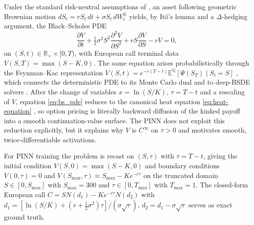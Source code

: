 Under the standard risk-neutral assumptions of \textcite{black1973pricing,merton1973rational}, an asset following geometric Brownian motion $dS_t=rS_t\,dt+\sigma S_t\,dW_t^{\mathbb{Q}}$ yields, by It\^o's lemma \parencite{itoh1944stochastic} and a $\Delta$-hedging argument, the Black--Scholes PDE
\begin{equation}\label{eq:bs_pde}
    \frac{\partial V}{\partial t}+\tfrac{1}{2}\sigma^2 S^2\frac{\partial^2 V}{\partial S^2}+rS\frac{\partial V}{\partial S}-rV=0,
\end{equation}
on $(S,t)\in\mathbb{R}_+\times[0,T)$, with European call terminal data $V(S,T)=\max(S-K,0)$. The same equation arises probabilistically through the Feynman--Kac representation $V(S,t)=e^{-r(T-t)}\mathbb{E}^{\mathbb{Q}}[\Psi(S_T)\mid S_t=S]$ \parencite{shreve2004stochastic}, which connects the deterministic PDE to its Monte Carlo dual \parencite{glasserman2003monte} and to deep-BSDE solvers \parencite{han2018solving,e2017deep,beck2020deepbsde}. After the change of variables $x=\ln(S/K)$, $\tau=T-t$ and a rescaling of $V$, equation \eqref{eq:bs_pde} reduces to the canonical heat equation \eqref{eq:heat-equation} \parencite{wilmott1995mathematics,capinski2012blackscholes}, so option pricing is literally backward diffusion of the kinked payoff into a smooth continuation-value surface. The PINN does not exploit this reduction explicitly, but it explains why $V$ is $C^{\infty}$ on $\tau>0$ and motivates smooth, twice-differentiable activations.

For PINN training the problem is recast on $(S,\tau)$ with $\tau=T-t$, giving the initial condition $V(S,0)=\max(S-K,0)$ and boundary conditions $V(0,\tau)=0$ and $V(S_{\max},\tau)\approx S_{\max}-Ke^{-r\tau}$ on the truncated domain $S\in[0,S_{\max}]$ with $S_{\max}=300$ and $\tau\in[0,T_{\max}]$ with $T_{\max}=1$. The closed-form European call $C=SN(d_1)-Ke^{-r\tau}N(d_2)$ with $d_1=[\ln(S/K)+(r+\tfrac{1}{2}\sigma^2)\tau]/(\sigma\sqrt{\tau})$, $d_2=d_1-\sigma\sqrt{\tau}$ \parencite{black1973pricing} serves as exact ground truth.

